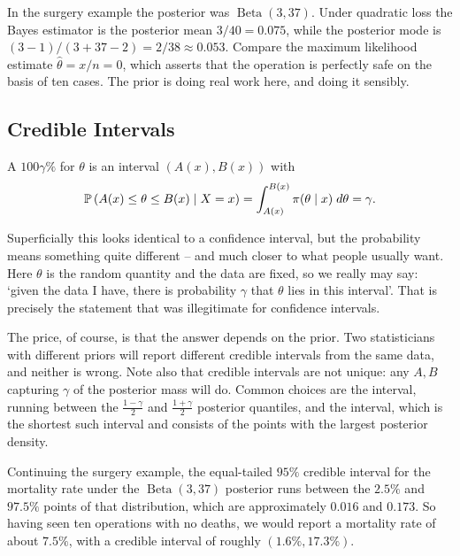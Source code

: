 \documentclass[a4paper]{scrartcl}
\newcommand{\BetaD}{\operatorname{Beta}}
\begin{document}
\begin{example}
  In the surgery example the posterior was $\BetaD(3,37)$. Under quadratic loss the Bayes estimator is the posterior mean $3/40 = 0.075$, while the posterior mode is $(3-1)/(3+37-2) = 2/38 \approx 0.053$. Compare the maximum likelihood estimate $\hat\theta = x/n = 0$, which asserts that the operation is perfectly safe on the basis of ten cases. The prior is doing real work here, and doing it sensibly.
\end{example}

\subsection{Credible Intervals}

\begin{definition}
  A $100\gamma\%$  for $\theta$ is an interval $(A(x), B(x))$ with
  $$
  \mathbb{P}\left(A(x) \leq \theta \leq B(x) \mid X = x\right) = \int_{A(x)}^{B(x)}\pi(\theta\mid x)\; d\theta = \gamma.
  $$
\end{definition}

Superficially this looks identical to a confidence interval, but the probability means something quite different -- and much closer to what people usually want. Here $\theta$ is the random quantity and the data are fixed, so we really may say: `given the data I have, there is probability $\gamma$ that $\theta$ lies in this interval'. That is precisely the statement that was illegitimate for confidence intervals.

The price, of course, is that the answer depends on the prior. Two statisticians with different priors will report different credible intervals from the same data, and neither is wrong. Note also that credible intervals are not unique: any $A, B$ capturing $\gamma$ of the posterior mass will do. Common choices are the  interval, running between the $\frac{1-\gamma}{2}$ and $\frac{1+\gamma}{2}$ posterior quantiles, and the  interval, which is the shortest such interval and consists of the points with the largest posterior density.

\begin{example}
  Continuing the surgery example, the equal-tailed $95\%$ credible interval for the mortality rate under the $\BetaD(3,37)$ posterior runs between the $2.5\%$ and $97.5\%$ points of that distribution, which are approximately $0.016$ and $0.173$. So having seen ten operations with no deaths, we would report a mortality rate of about $7.5\%$, with a credible interval of roughly $(1.6\%, 17.3\%)$.
\end{example}
\end{document}
